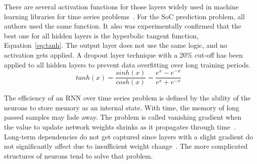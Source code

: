 %
%
There are several activation functions for those layers widely used in machine learning libraries for time series problems~\cite{amidi_cs_2018}.
For the SoC prediction problem, all authors used the same function.
It also was experimentally confirmed that the best one for all hidden layers is the hyperbolic tangent function, Equation~\ref{eq:tanh}.
The output layer does not use the same logic, and no activation gets applied.
A dropout layer technique with a 20\% cut-off has been applied to all hidden layers to prevent data overfitting over long training periods.
\begin{equation}
    tanh(x) = \frac{sinh(x)}{cosh(x)}=\frac{e^x-e^{-x}}{e^x+e^{-x}}
    \label{eq:tanh}
\end{equation}
%
%


%
The efficiency of an RNN over time series problem is defined by the ability of the neurons to store memory as an internal state.
With time, the memory of long passed samples may fade away.
The problem is called vanishing gradient when the value to update network weights shrinks as it propagates through time~\cite{rasifaghihi_predictive_2020}.
Long-term dependencies do not get captured since layers with a slight gradient do not significantly affect due to insufficient weight change~\cite{rasifaghihi_predictive_2020,hochreiter_vanishing_1998}.
The more complicated structures of neurons tend to solve that problem.

